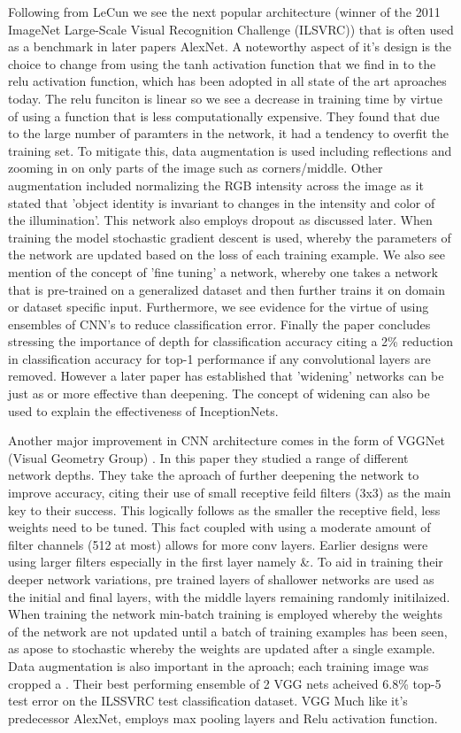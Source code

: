   Following from LeCun we see the next popular architecture (winner of the 2011 ImageNet Large-Scale Visual Recognition Challenge (ILSVRC)) that is often used as a benchmark in later papers AlexNet\cite{Krizhevsky}. A noteworthy aspect of it's design is the choice to change from using the tanh activation function that we find in \cite{leCun1998} to the relu activation function, which has been adopted in all state of the art aproaches today. The relu funciton is linear so we see a decrease in training time by virtue of using a function that is less computationally expensive. They found that due to the large number of paramters in the network, it had a tendency to overfit the training set. To mitigate this, data augmentation is used including reflections and zooming in on only parts of the image such as corners/middle. Other augmentation included normalizing the RGB intensity across the image as it stated that 'object identity is invariant to changes in the intensity and color of the illumination'. This network also employs dropout as discussed later. When training the model stochastic gradient descent is used, whereby the parameters of the network are updated based on the loss of each training example. We also see mention of the concept of 'fine tuning' a network, whereby one takes a network that is pre-trained on a generalized dataset and then further trains it on domain or dataset specific input. Furthermore, we see evidence for the virtue of using ensembles of CNN's to reduce classification error. Finally the paper concludes stressing the importance of depth for classification accuracy citing a 2\% reduction in classification accuracy for top-1 performance if any convolutional layers are removed. However a later paper \cite{Zagoruyko} has established that 'widening' networks can be just as or more effective than deepening. The concept of widening can also be used to explain the effectiveness of InceptionNets.
  \par
  Another major improvement in CNN architecture comes in the form of VGGNet (Visual Geometry Group) \cite{Simonyan2015}. In this paper they studied a range of different network depths. They take the aproach of further deepening the network to improve accuracy, citing their use of small receptive feild filters (3x3) as the main key to their success. This logically follows as the smaller the receptive field, less weights need to be tuned. This fact coupled with using a moderate amount of filter channels (512 at most) allows for more conv layers. Earlier designs were using larger filters especially in the first layer namely \cite{Krizhevsky}\&\cite{Sermanet2013}. To aid in training their deeper network variations, pre trained layers of shallower networks are used as the initial and final layers, with the middle layers remaining randomly initilaized. When training the network min-batch training is employed whereby the weights of the network are not updated until a batch of training examples has been seen, as apose to stochastic whereby the weights are updated after a single example. Data augmentation is also important in the aproach; each training image was cropped a . Their best performing ensemble of 2 VGG nets acheived 6.8\% top-5 test error on the ILSSVRC test classification dataset. VGG Much like it's predecessor AlexNet, employs max pooling layers and Relu activation function.
